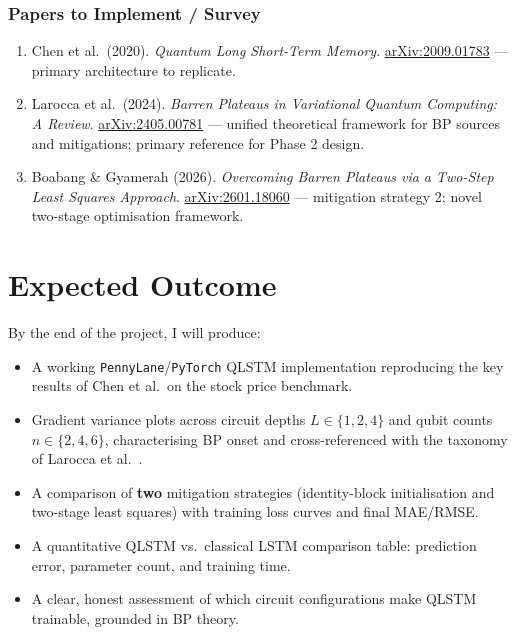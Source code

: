 \documentclass[10pt,twocolumn]{article}
\begin{document}
\subsubsection*{Papers to Implement / Survey}
\begin{enumerate}
  \item Chen et al.\ (2020). \emph{Quantum Long Short-Term Memory}. \href{https://arxiv.org/abs/2009.01783}{arXiv:2009.01783} --- primary architecture to replicate.
  \item Larocca et al.\ (2024). \emph{Barren Plateaus in Variational Quantum Computing: A Review}. \href{https://arxiv.org/abs/2405.00781}{arXiv:2405.00781} --- unified theoretical framework for BP sources and mitigations; primary reference for Phase 2 design.
  \item Boabang \& Gyamerah (2026). \emph{Overcoming Barren Plateaus via a Two-Step Least Squares Approach}. \href{https://arxiv.org/abs/2601.18060}{arXiv:2601.18060} --- mitigation strategy 2; novel two-stage optimisation framework.
\end{enumerate}


\section{Expected Outcome}

By the end of the project, I will produce:
\begin{itemize}
  \item A working \texttt{PennyLane}/\texttt{PyTorch} QLSTM implementation reproducing the key results of Chen et al.\ on the stock price benchmark.
  \item Gradient variance plots across circuit depths $L \in \{1,2,4\}$ and qubit counts $n \in \{2,4,6\}$, characterising BP onset and cross-referenced with the taxonomy of Larocca et al.~\cite{larocca2024review}.
  \item A comparison of \textbf{two} mitigation strategies (identity-block initialisation and two-stage least squares) with training loss curves and final MAE/RMSE.
  \item A quantitative QLSTM vs.\ classical LSTM comparison table: prediction error, parameter count, and training time.
  \item A clear, honest assessment of which circuit configurations make QLSTM trainable, grounded in BP theory.
\end{itemize}
\end{document}
